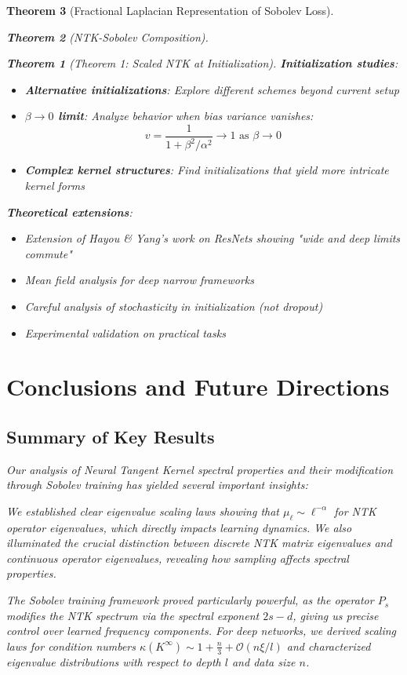 \documentclass{article}
\newtheorem{theorem}{Theorem}[section]
\begin{document}
\begin{theorem}[Fractional Laplacian Representation of Sobolev Loss]
\begin{theorem}[NTK-Sobolev Composition]
\begin{theorem}[Theorem 1: Scaled NTK at Initialization]
\textbf{Initialization studies}:
\begin{itemize}
\item \textbf{Alternative initializations}: Explore different schemes beyond current setup
\item \textbf{$\beta \to 0$ limit}: Analyze behavior when bias variance vanishes:
  \[ v = \frac{1}{1 + \beta^2/\alpha^2} \to 1 \text{ as } \beta \to 0 \]
\item \textbf{Complex kernel structures}: Find initializations that yield more intricate kernel forms
\end{itemize}

\textbf{Theoretical extensions}:
\begin{itemize}
\item Extension of Hayou \& Yang's work on ResNets showing "wide and deep limits commute"
\item Mean field analysis for deep narrow frameworks
\item Careful analysis of stochasticity in initialization (not dropout)
\item Experimental validation on practical tasks
\end{itemize}





\section{Conclusions and Future Directions}

\subsection{Summary of Key Results}

Our analysis of Neural Tangent Kernel spectral properties and their modification through Sobolev training has yielded several important insights:

We established clear eigenvalue scaling laws showing that $\mu_\ell \sim \ell^{-\alpha}$ for NTK operator eigenvalues, which directly impacts learning dynamics. We also illuminated the crucial distinction between discrete NTK matrix eigenvalues and continuous operator eigenvalues, revealing how sampling affects spectral properties.

The Sobolev training framework proved particularly powerful, as the operator $P_s$ modifies the NTK spectrum via the spectral exponent $2s-d$, giving us precise control over learned frequency components. For deep networks, we derived scaling laws for condition numbers $\kappa(K^{\infty}) \sim 1 + \frac{n}{3} + \mathcal{O}(n \xi / l)$ and characterized eigenvalue distributions with respect to depth $l$ and data size $n$.


\end{theorem}
\end{theorem}
\end{theorem}
\end{document}
